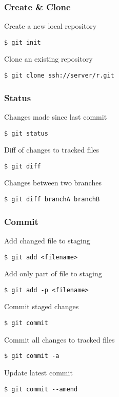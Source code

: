 \begingroup
{}

\titlespacing*{\subsubsection}{0pt}{6pt}{2pt}

\begin{multicols}{2}

\subsubsection*{Create \& Clone}
Create a new local repository
\begin{lstlisting}
$ git init
\end{lstlisting}
Clone an existing repository
\begin{lstlisting}
$ git clone ssh://server/r.git
\end{lstlisting}

\subsubsection*{Status}
Changes made since last commit
\begin{lstlisting}
$ git status
\end{lstlisting}
Diff of changes to tracked files
\begin{lstlisting}
$ git diff
\end{lstlisting}
Changes between two branches
\begin{lstlisting}
$ git diff branchA branchB
\end{lstlisting}

\subsubsection*{Commit}
Add changed file to staging
\begin{lstlisting}
$ git add <filename>
\end{lstlisting}
Add only part of file to staging
\begin{lstlisting}
$ git add -p <filename>
\end{lstlisting}
Commit staged changes
\begin{lstlisting}
$ git commit
\end{lstlisting}
Commit all changes to tracked files
\begin{lstlisting}
$ git commit -a
\end{lstlisting}
Update latest commit
\begin{lstlisting}
$ git commit --amend
\end{lstlisting}


\end{multicols}
